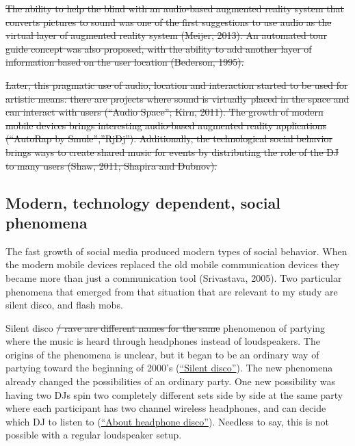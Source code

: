 \st{The ability to help the blind with an audio-based augmented reality system that converts pictures to sound was one of the first suggestions to use audio as the virtual layer of augmented reality system (Meijer, 2013). An automated tour guide concept was also proposed, with the ability to add another layer of information based on the user location (Bederson, 1995).}

\st{Later, this pragmatic use of audio, location and interaction started to be used for artistic means: there are projects where sound is virtually placed in the space and can interact with users (``Audio Space''; Kirn, 2011). The growth of modern mobile devices brings interesting audio-based augmented reality applications (``AutoRap by Smule'',''RjDj''). Additionally, the technological social behavior brings ways to create shared music for events by distributing the role of the DJ to many users (Shaw, 2011; Shapira and Dubnov).}

\subsection{Modern, technology dependent, social phenomena}


The fast growth of social media produced modern types of social behavior. When the modern mobile devices replaced the old mobile communication devices they became more than just a communication tool (Srivastava, 2005). Two particular phenomena that emerged from that situation that are relevant to my study are silent disco, and flash mobs.

Silent disco \st{/ rave are different names for the same}  phenomenon of partying where the music is heard through headphones instead of loudspeakers. The origins of the phenomena is unclear, but it began to be an ordinary way of partying toward the beginning of 2000's (\href{http://en.wikipedia.org/wiki/Silent_disco}{``Silent disco''}). The new phenomena already changed the possibilities of an ordinary party. One new possibility was having two DJs spin two completely different sets side by side at the same party where each participant has two channel wireless headphones, and can decide which DJ to listen to (\href{http://headphonedisco.com/about.php}{``About headphone disco''}). Needless to say, this is not possible with a regular loudspeaker setup.

